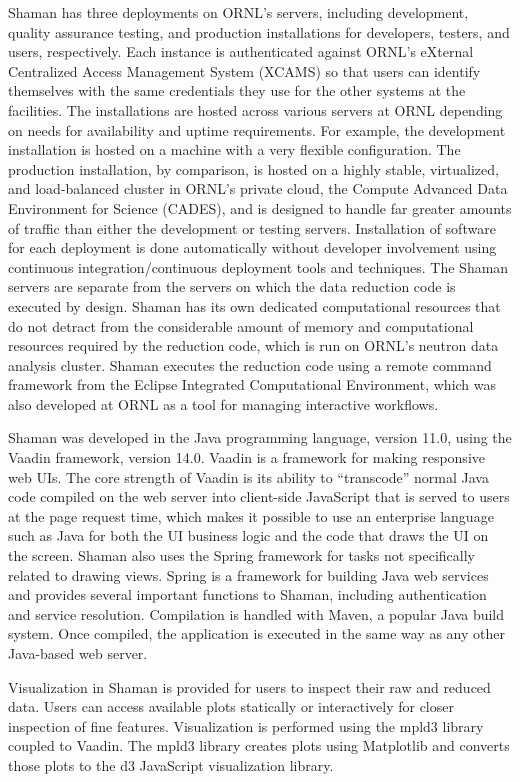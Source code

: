 Shaman has three deployments on ORNL’s servers, including development, quality assurance testing,
and production installations for developers, testers, and users, respectively. Each instance is
authenticated against ORNL’s eXternal Centralized Access Management System (XCAMS) so that users can
identify themselves with the same credentials they use for the other systems at the facilities. The
installations are hosted across various servers at ORNL depending on needs for availability and
uptime requirements. For example, the development installation is hosted on a machine with a very
flexible configuration. The production installation, by comparison, is hosted on a highly stable,
virtualized, and load-balanced cluster in ORNL’s private cloud, the Compute Advanced Data
Environment for Science (CADES), and is designed to handle far greater amounts of traffic than
either the development or testing servers. Installation of software for each deployment is done
automatically without developer involvement using continuous integration/continuous deployment tools
and techniques. The Shaman servers are separate from the servers on which the data reduction code is
executed by design. Shaman has its own dedicated computational resources that do not detract from
the considerable amount of memory and computational resources required by the reduction code, which
is run on ORNL’s neutron data analysis cluster. Shaman executes the reduction code using a remote
command framework from the Eclipse Integrated Computational Environment, which was also developed at
ORNL as a tool for managing interactive workflows.

Shaman was developed in the Java programming language, version 11.0, using the Vaadin framework,
version 14.0. Vaadin is a framework for making responsive web UIs. The core strength of Vaadin is
its ability to “transcode” normal Java code compiled on the web server into client-side JavaScript
that is served to users at the page request time, which makes it possible to use an enterprise
language such as Java for both the UI business logic and the code that draws the UI on the screen.
Shaman also uses the Spring framework for tasks not specifically related to drawing views. Spring is
a framework for building Java web services and provides several important functions to Shaman,
including authentication and service resolution. Compilation is handled with Maven, a popular Java
build system. Once compiled, the application is executed in the same way as any other Java-based web
server.

Visualization in Shaman is provided for users to inspect their raw and reduced data. Users can
access available plots statically or interactively for closer inspection of fine features.
Visualization is performed using the mpld3 library coupled to Vaadin. The mpld3 library creates
plots using Matplotlib and converts those plots to the d3 JavaScript visualization library.

